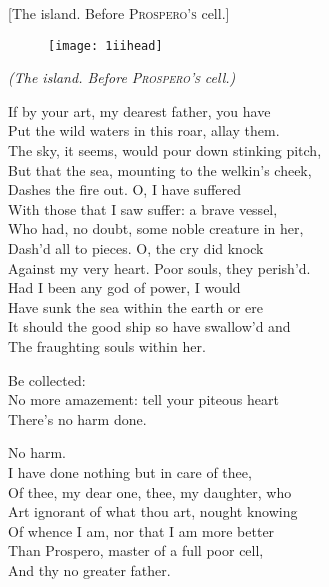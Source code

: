 [The island. Before \textsc{Prospero's} cell.]



\begin{figure}[t]
	\centering
	\texttt{[image: 1iihead]}
\end{figure}




\textit{(The island. Before \textsc{Prospero's} cell.)}\centering

\begin{verse_speech}[Miranda] 
If by your art, my dearest father, you have\\
Put the wild waters in this roar, allay them.\\
The sky, it seems, would pour down stinking pitch,\\
But that the sea, mounting to the welkin's cheek,\\
Dashes the fire out. O, I have suffered\\
With those that I saw suffer: a brave vessel,\\
Who had, no doubt, some noble creature in her,\\
Dash'd all to pieces. O, the cry did knock\\
Against my very heart. Poor souls, they perish'd.\\
Had I been any god of power, I would\\
Have sunk the sea within the earth or ere\\
It should the good ship so have swallow'd and\\
The fraughting souls within her.\\
\end{verse_speech}


\begin{verse_speech}[Prospero] 
Be collected:\\
No more amazement: tell your piteous heart\\
There's no harm done.\\
\end{verse_speech}

	
\begin{verse_speech}[Prospero] 
No harm.\\
I have done nothing but in care of thee,\\
Of thee, my dear one, thee, my daughter, who\\
Art ignorant of what thou art, nought knowing\\
Of whence I am, nor that I am more better\\
Than Prospero, master of a full poor cell,\\
And thy no greater father.
\end{verse_speech}


